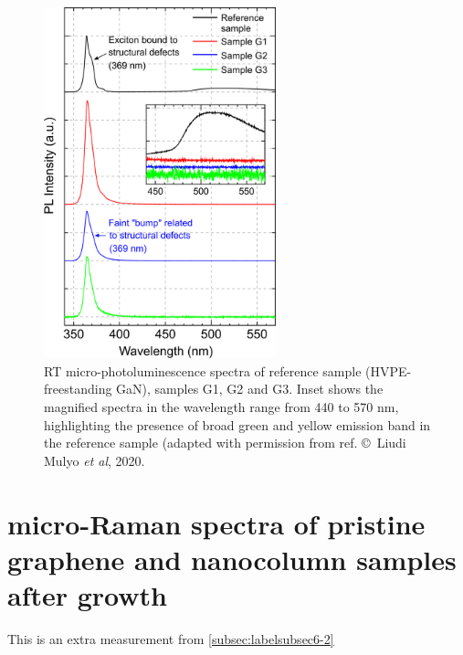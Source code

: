 \begin{figure}[H]
    \centering
    \includegraphics[width=0.6\textwidth]{figures/paper-iv/fig-7.png}
    \caption[RT micro-photoluminescence spectra of reference sample\newline (HVPE-freestanding GaN), samples G1, G2 and G3]{RT micro-photoluminescence spectra of reference sample (HVPE-freestanding GaN), samples G1, G2 and G3. Inset shows the magnified spectra in the wavelength range from 440 to 570 nm, highlighting the presence of broad green and yellow emission band in the reference sample (adapted with permission from ref.  \copyright \ Liudi Mulyo \textit{et al}, 2020.}
    \label{fig:figures/paper-iv/fig-7}
\end{figure}

\newpage

\section[micro-Raman spectra]{micro-Raman spectra of pristine graphene and nanocolumn samples after growth}

This is an extra measurement from \autoref{subsec:labelsubsec6-2}

